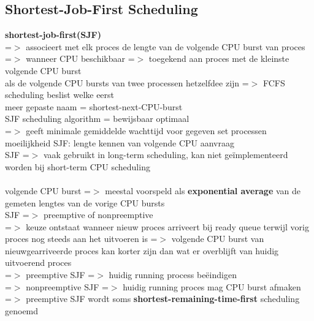 \documentclass{report}
\begin{document}
\subsection{Shortest-Job-First Scheduling}
\textbf{shortest-job-first(SJF)}
\\=$>$ associeert met elk proces de lengte van de volgende CPU burst van proces
\\=$>$ wanneer CPU beschikbaar =$>$ toegekend aan proces met de kleinste volgende CPU burst
\\als de volgende CPU bursts van twee processen hetzelfdee zijn =$>$ FCFS scheduling beslist welke eerst
\\meer gepaste naam = shortest-next-CPU-burst
\\SJF scheduling algorithm = bewijsbaar optimaal
\\=$>$ geeft minimale gemiddelde wachttijd voor gegeven set processen 
\\moeilijkheid SJF: lengte kennen van volgende CPU aanvraag
\\SJF =$>$ vaak gebruikt in long-term scheduling, kan niet ge\"implementeerd worden bij short-term CPU scheduling
\\
\\volgende CPU burst =$>$ meestal voorspeld als \textbf{exponential average} van de gemeten lengtes van de vorige CPU bursts
\\ SJF =$>$ preemptive of nonpreemptive
\\=$>$ keuze ontstaat wanneer nieuw proces arriveert bij ready queue terwijl vorig proces nog steeds aan het uitvoeren is =$>$ volgende CPU burst van nieuwgearriveerde proces kan korter zijn dan wat er overblijft van huidig uitvoerend proces
\\=$>$ preemptive SJF =$>$ huidig running process be\"eindigen 
\\=$>$ nonpreemptive SJF =$>$ huidig running proces mag CPU burst afmaken
\\=$>$ preemptive SJF wordt soms \textbf{shortest-remaining-time-first} scheduling genoemd
\end{document}
